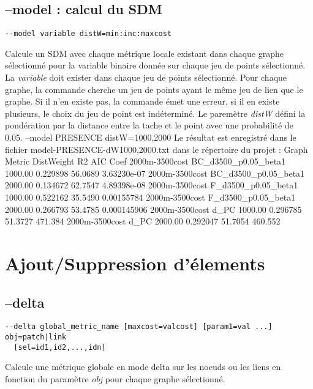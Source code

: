 \documentclass[a4paper,10pt]{report}
\newenvironment{cmd}
{\quote\Verbatim}
{\endVerbatim\endquote}
\begin{document}
\subsection{--model : calcul du SDM}
\begin{verbatim}
--model variable distW=min:inc:maxcost
\end{verbatim}
Calcule un SDM avec chaque métrique locale existant dans chaque graphe sélectionné pour la variable binaire donnée sur chaque jeu de points sélectionné.
La \textit{variable} doit exister dans chaque jeu de points sélectionné.
Pour chaque graphe, la commande cherche un jeu de points ayant le même jeu de lien que le graphe. Si il n'en existe pas, la commande émet une erreur, si il en existe plusieurs, le choix du jeu de point est indéterminé.
Le paremètre \textit{distW} défini la pondération par la distance entre la tache et le point avec une probabilité de 0.05.
\begin{cmd}
--model PRESENCE distW=1000,2000
\end{cmd}
Le résultat est enregistré dans le fichier model-PRESENCE-dW1000,2000.txt dans le répertoire du projet :
\begin{cmd}[tabsize=3]
Graph           Metric                DistWeight R2        AIC       Coef
2000m-3500cost  BC_d3500_p0.05_beta1  1000.00	0.229898	56.0689	3.63230e-07
2000m-3500cost  BC_d3500_p0.05_beta1  2000.00	0.134672	62.7547	4.89398e-08
2000m-3500cost  F_d3500_p0.05_beta1   1000.00	0.522162	35.5490	0.00155784
2000m-3500cost  F_d3500_p0.05_beta1   2000.00	0.266793	53.4785	0.000145906
2000m-3500cost  d_PC                  1000.00	0.296785	51.3727	471.384
2000m-3500cost  d_PC                  2000.00	0.292047	51.7054	460.552
\end{cmd}

\section{Ajout/Suppression d'élements}
\subsection{--delta}
\begin{verbatim}
--delta global_metric_name [maxcost=valcost] [param1=val ...] obj=patch|link 
  [sel=id1,id2,...,idn]
\end{verbatim}
Calcule une métrique globale en mode delta sur les noeuds ou les liens en fonction du paramètre \textit{obj} pour chaque graphe sélectionné.
\end{document}
